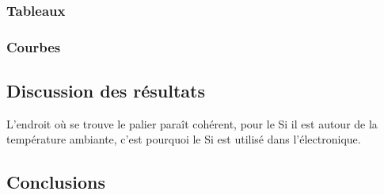\subsubsection*{Tableaux}

\subsubsection*{Courbes}


\subsection{Discussion des résultats}

L'endroit où se trouve le palier paraît cohérent, pour le Si il est autour de la température ambiante, c'est pourquoi le Si est utilisé dans l'électronique.




\subsection{Conclusions}

